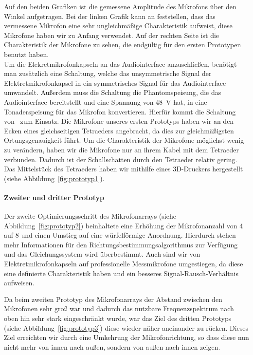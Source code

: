 Auf den beiden Grafiken ist die gemessene Amplitude des Mikrofons über den Winkel aufgetragen. Bei der linken Grafik kann an feststellen, dass das vermessene Mikrofon eine sehr ungleichmäßige Charakteristik aufweist, diese Mikrofone haben wir zu Anfang verwendet. Auf der rechten Seite ist die Charakteristik der Mikrofone zu sehen, die endgültig für den ersten Prototypen benutzt haben.\\
Um die Elekretmikrofonkapseln an das Audiointerface anzuschließen, benötigt man zusätzlich eine Schaltung, welche das unsymmetrische Signal der Elektretmikrofonkapsel in ein symmetrisches Signal für das Audiointerface umwandelt. Außerdem muss die Schaltung die Phantomspeisung, die das Audiointerface bereitstellt und eine Spannung von \SI{48}{\volt} hat, in eine Tonaderspeisung für das Mikrofon konvertieren. Hierfür kommt die Schaltung von~\cite{Powering_microphones} zum Einsatz.
Die Mikrofone unseres ersten Prototyps haben wir an den Ecken eines gleichseitigen Tetraeders angebracht, da dies zur gleichmäßigsten Ortungsgenauigkeit führt. Um die Charakteristik der Mikrofone möglichst wenig zu verändern, haben wir die Mikrofone nur an ihrem Kabel mit dem Tetraeder verbunden. Dadurch ist der Schallschatten durch den Tetraeder relativ gering. Das Mittelstück des Tetraeders haben wir mithilfe eines 3D-Druckers hergestellt (siehe Abbildung~\ref{fig:prototyp1}).\\

\paragraph{Zweiter und dritter Prototyp}
Der zweite Optimierungsschritt des Mikrofonarrays (siehe Abbildung~\ref{fig:prototyp2}) beinhaltete eine Erhöhung der Mikrofonanzahl von \num{4} auf \num{8} und einen Umstieg auf eine würfelförmige Anordnung. Hierdurch stehen mehr Informationen für den Richtungsbestimmungsalgorithmus zur Verfügung und das Gleichungssystem wird überbestimmt. Auch sind wir von Elektretmikrofonkapseln auf professionelle Messmikrofone umgestiegen, da diese eine definierte Charakteristik haben und ein besseres Signal-Rausch-Verhältnis aufweisen.

Da beim zweiten Prototyp des Mikrofonarrays der Abstand zwischen den Mikrofonen sehr groß war und dadurch das nutzbare Frequenzspektrum nach oben hin sehr stark eingeschränkt wurde, war das Ziel des dritten Prototyps (siehe Abbildung~\ref{fig:prototyp3}) diese wieder näher aneinander zu rücken. Dieses Ziel erreichten wir durch eine Umkehrung der Mikrofonrichtung, so dass diese nun nicht mehr von innen nach außen, sondern von außen nach innen zeigen.
